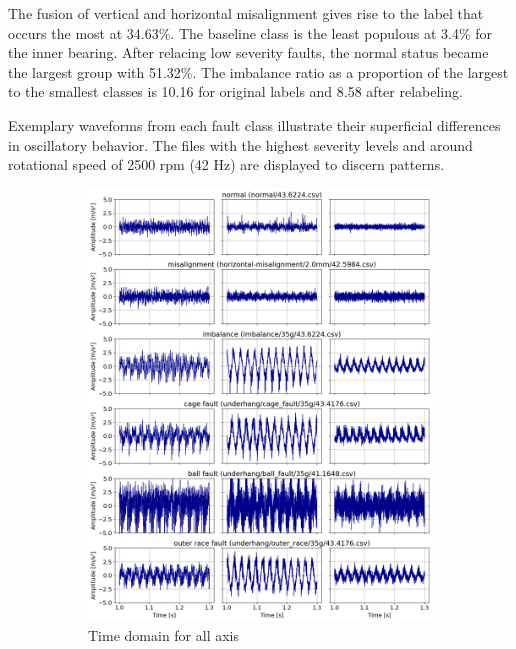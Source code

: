 The fusion of vertical and horizontal misalignment gives rise to the label that occurs the most at 34.63\%. The baseline class is the least populous at 3.4\% for the inner bearing. After relacing low severity faults, the normal status became the largest group with 51.32\%. The imbalance ratio as a proportion of the largest to the smallest classes is 10.16 for original labels and 8.58 after relabeling.

Exemplary waveforms from each fault class illustrate their superficial differences in oscillatory behavior. The files with the highest severity levels and around rotational speed of 2500 rpm (42 Hz) are displayed to discern patterns.
\begin{figure}[h]
    \centering
    \begin{subfigure}[b]{0.48\textwidth}
        \includegraphics[width=\textwidth]{assets/results/eda/mafaulda-TD-A.png}
        \caption{Time domain for all axis}
        \label{fig:design:fault-temporal-waveform}
    \end{subfigure}
    \hfill
    \begin{subfigure}[b]{0.50\textwidth}

\end{subfigure}
\end{figure}
